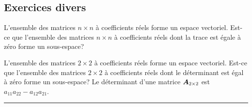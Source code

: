 \begin{TwoCol}
\section{Exercices divers}

\begin{exercice}
L'ensemble des matrices $n\times n$ à coefficients réels forme un espace vectoriel.  Est-ce que l'ensemble
des matrices $n\times n$ à coefficients réels dont la trace est égale à zéro forme un sous-espace?
\end{exercice}
\begin{exercice}
L'ensemble des matrices $2\times 2$ à coefficients réels forme un espace vectoriel.  Est-ce que l'ensemble
des matrices $2\times 2$ à coefficients réels dont le déterminant est égal à zéro forme un sous-espace?
Le déterminant d'une matrice $\boldsymbol{A}_{2\times 2}$ est $a_{11}a_{22} - a_{12}a_{21}$.
\end{exercice}

\end{TwoCol}

\hrule

